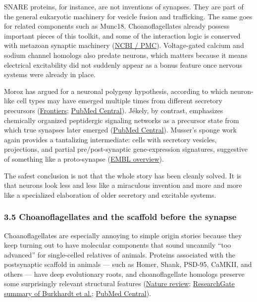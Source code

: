 SNARE proteins, for instance, are not inventions of synapses. They are part of the general eukaryotic machinery for vesicle fusion and trafficking. The same goes for related components such as Munc18. Choanoflagellates already possess important pieces of this toolkit, and some of the interaction logic is conserved with metazoan synaptic machinery (\href{https://www.ncbi.nlm.nih.gov/pmc/articles/PMC4137706/}{NCBI / PMC}). Voltage-gated calcium and sodium channel homologs also predate neurons, which matters because it means electrical excitability did not suddenly appear as a bonus feature once nervous systems were already in place.

Moroz has argued for a neuronal polygeny hypothesis, according to which neuron-like cell types may have emerged multiple times from different secretory precursors (\href{https://www.frontiersin.org/journals/cell-and-developmental-biology/articles/10.3389/fcell.2021.669087/full}{Frontiers}; \href{https://pmc.ncbi.nlm.nih.gov/articles/PMC8293673/}{PubMed Central}). Jékely, by contrast, emphasizes chemically organized peptidergic signaling networks as a precursor state from which true synapses later emerged (\href{https://pmc.ncbi.nlm.nih.gov/articles/PMC9233960/}{PubMed Central}). Musser's sponge work again provides a tantalizing intermediate: cells with secretory vesicles, projections, and partial pre/post-synaptic gene-expression signatures, suggestive of something like a proto-synapse (\href{https://www.embl.org/ells/2023/11/27/making-sense-of-our-brain-in-the-light-of-evolution/}{EMBL overview}).

The safest conclusion is not that the whole story has been cleanly solved. It is that neurons look less and less like a miraculous invention and more and more like a specialized elaboration of older secretory and excitable systems.

\subsubsection{3.5 Choanoflagellates and the scaffold before the synapse}\label{03_it_started-choanoflagellates-and-the-scaffold-before-the-synapse}

Choanoflagellates are especially annoying to simple origin stories because they keep turning out to have molecular components that sound uncannily ``too advanced'' for single-celled relatives of animals. Proteins associated with the postsynaptic scaffold in animals --- such as Homer, Shank, PSD-95, CaMKII, and others --- have deep evolutionary roots, and choanoflagellate homologs preserve some surprisingly relevant structural features (\href{https://www.nature.com/articles/s41583-025-00983-6}{Nature review}; \href{https://www.researchgate.net/publication/272496772_The_origin_and_evolution_of_synaptic_proteins_-_Choanoflagellates_lead_the_way}{ResearchGate summary of Burkhardt et al.}; \href{https://pmc.ncbi.nlm.nih.gov/articles/PMC2824662/}{PubMed Central}).

